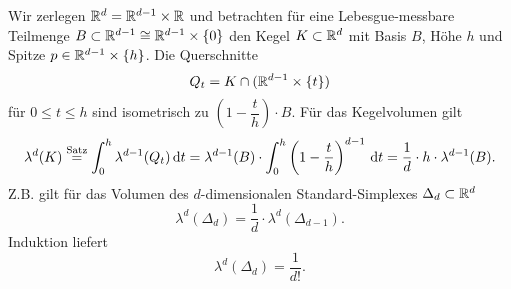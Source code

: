 \begin{example}
Wir zerlegen $\mathbb{R}^d=\mathbb{R}^{d-1}\times \mathbb{R}$ und betrachten für eine Lebesgue-messbare Teilmenge $B\subset \mathbb{R}^{d-1}\cong \mathbb{R}^{d-1}\times\{0\}$ den Kegel $K\subset \mathbb{R}^d$ mit Basis $B$, Höhe $h$ und Spitze $p\in \mathbb{R}^{d-1}\times \{h\}$. Die Querschnitte 
$$Q_t = K\cap (\mathbb{R}^{d-1} \times \{t\})$$
für $0\leq t \leq h$ sind isometrisch zu $\left(1-\dfrac{t}{h}\right)\cdot B$. Für das Kegelvolumen gilt
\begin{equation*}
\begin{split}
	\lambda^d(K) \overset{\text{Satz}}= \int_0^h \lambda^{d-1} (Q_t)\, \mathrm{d} t 
	=\lambda^{d-1}(B) \cdot \int_0^h \left( 1- \frac{t}{h}\right)^{d-1} \, \mathrm{d} t = \frac{1}{d}\cdot h \cdot \lambda^{d-1}(B).
\end{split}
\end{equation*}
Z.B. gilt für das Volumen des $d$-dimensionalen Standard-Simplexes $\Delta_d \subset \mathbb{R}^d$
$$\lambda^d(\Delta_d)=\frac{1}{d}\cdot \lambda^d (\Delta_{d-1}).$$
Induktion liefert
$$\lambda^d(\Delta_d)=\frac{1}{d!}.$$
\end{example}

